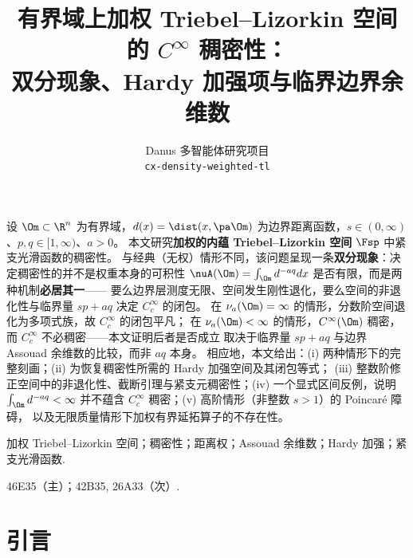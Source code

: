 



\title{\bf 有界域上加权 Triebel--Lizorkin 空间的 $C^{\infty}$ 稠密性：\\[2pt]
双分现象、Hardy 加强项与临界边界余维数}
\author{Danus 多智能体研究项目\\[2pt]
\texttt{cx-density-weighted-tl}}
\date{}
\maketitle

\vspace{-0.4cm}
\begin{center}
\begin{minipage}{13.6cm}\small
{}\quad
设 $\Om\subset\R^n$ 为有界域，$d(x)=\dist(x,\pa\Om)$ 为边界距离函数，$s\in(0,\infty)$、$p,q\in[1,\infty)$、$a>0$。
本文研究\textbf{加权的内蕴 Triebel--Lizorkin 空间} $\Fsp$ 中紧支光滑函数的稠密性。
与经典（无权）情形不同，该问题呈现一条\textbf{双分现象}：决定稠密性的并不是权重本身的可积性
$\nuA(\Om)=\int_\Om d^{-aq}dx$ 是否有限，而是两种机制\textbf{必居其一}——
要么边界层测度无限、空间发生刚性退化，要么空间的非退化性与临界量 $sp+aq$ 决定 $C_c^\infty$ 的闭包。
在 $\nu_a(\Om)=\infty$ 的情形，分数阶空间退化为多项式族，故 $C_c^\infty$ 的闭包平凡；
在 $\nu_a(\Om)<\infty$ 的情形，$C^\infty(\Om)$ 稠密，而 $C_c^\infty$ 不必稠密——本文证明后者是否成立
取决于临界量 $sp+aq$ 与边界 Assouad 余维数的比较，而非 $aq$ 本身。
相应地，本文给出：(i) 两种情形下的完整刻画；(ii) 为恢复稠密性所需的 Hardy 加强空间及其闭包等式；
(iii) 整数阶修正空间中的非退化性、截断引理与紧支元稠密性；(iv) 一个显式区间反例，说明
$\int_\Om d^{-aq}<\infty$ 并不蕴含 $C_c^\infty$ 稠密；(v) 高阶情形（非整数 $s>1$）的 Poincar\'e 障碍，
以及无限质量情形下加权有界延拓算子的不存在性。
\medskip

\quad 加权 Triebel--Lizorkin 空间；稠密性；距离权；Assouad 余维数；Hardy 加强；紧支光滑函数.
\medskip

\quad 46E35（主）；42B35, 26A33（次）.
\end{minipage}
\end{center}

\vspace{0.1cm}
\tableofcontents

\section{引言}\label{s1}

